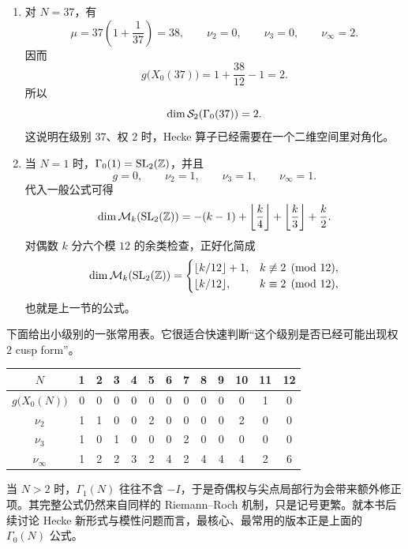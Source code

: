 \begin{example}
\label{ex:gamma0-37-and-1}
\begin{enumerate}
  \item 对 $N=37$，有
        \[
          \mu=37\left(1+\frac1{37}\right)=38,
          \qquad \nu_2=0,
          \qquad \nu_3=0,
          \qquad \nu_\infty=2.
        \]
        因而
        \[
          g\bigl(X_0(37)\bigr)=1+\frac{38}{12}-1=2.
        \]
        所以
        \[
          \dim \mathcal{S}_2(\Gamma_0(37))=2.
        \]
        这说明在级别 $37$、权 $2$ 时，Hecke 算子已经需要在一个二维空间里对角化。

  \item 当 $N=1$ 时，$\Gamma_0(1)=\mathrm{SL}_2(\mathbb{Z})$，并且
        \[
          g=0,\qquad \nu_2=1,\qquad \nu_3=1,\qquad \nu_\infty=1.
        \]
        代入一般公式可得
        \[
          \dim \mathcal{M}_k(\mathrm{SL}_2(\mathbb{Z}))=-(k-1)+\left\lfloor\frac{k}{4}\right\rfloor+
          \left\lfloor\frac{k}{3}\right\rfloor+\frac{k}{2}.
        \]
        对偶数 $k$ 分六个模 $12$ 的余类检查，正好化简成
        \[
          \dim \mathcal{M}_k(\mathrm{SL}_2(\mathbb{Z}))=
          \begin{cases}
            \lfloor k/12\rfloor+1,& k\not\equiv 2\pmod{12},\\
            \lfloor k/12\rfloor,& k\equiv 2\pmod{12},
          \end{cases}
        \]
        也就是上一节的公式。
\end{enumerate}
\end{example}

下面给出小级别的一张常用表。它很适合快速判断“这个级别是否已经可能出现权 $2$ cusp form”。

\begin{center}
\begin{tabular}{c|cccccccccccc}
\toprule
$N$ & 1 & 2 & 3 & 4 & 5 & 6 & 7 & 8 & 9 & 10 & 11 & 12 \\
\midrule
$g\bigl(X_0(N)\bigr)$ & 0 & 0 & 0 & 0 & 0 & 0 & 0 & 0 & 0 & 0 & 1 & 0 \\
$\nu_2$ & 1 & 1 & 0 & 0 & 2 & 0 & 0 & 0 & 0 & 2 & 0 & 0 \\
$\nu_3$ & 1 & 0 & 1 & 0 & 0 & 0 & 2 & 0 & 0 & 0 & 0 & 0 \\
$\nu_\infty$ & 1 & 2 & 2 & 3 & 2 & 4 & 2 & 4 & 4 & 4 & 2 & 6 \\
\bottomrule
\end{tabular}
\end{center}

\begin{remark}[关于 $\Gamma_1(N)$]
当 $N>2$ 时，$\Gamma_1(N)$ 往往不含 $-I$，于是奇偶权与尖点局部行为会带来额外修正项。其完整公式仍然来自同样的 Riemann--Roch 机制，只是记号更繁。就本书后续讨论 Hecke 新形式与模性问题而言，最核心、最常用的版本正是上面的 $\Gamma_0(N)$ 公式。
\end{remark}
